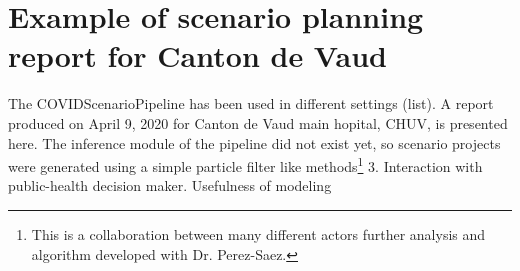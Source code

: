 {\FloatBarrier

\section{Example of scenario planning report for Canton de Vaud}
The COVIDScenarioPipeline has been used in different settings (list). A report produced on April 9, 2020 for Canton de Vaud main hopital, CHUV, is presented here. The inference module of the pipeline did not exist yet, so scenario projects were generated using a simple particle filter like methods\footnote{This is a collaboration between many different actors further analysis and algorithm developed with Dr. Perez-Saez.}
3. Interaction with public-health decision maker. Usefulness of modeling


 

}
